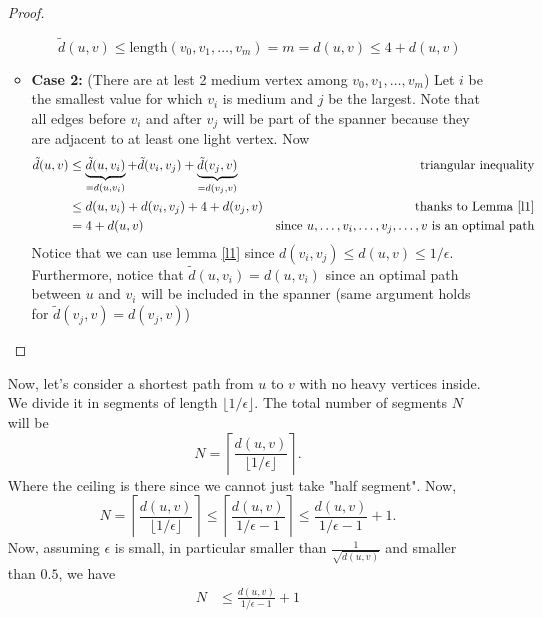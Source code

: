 \documentclass[11pt]{article}
\begin{document}
\begin{enumerate}
\begin{proof}
\begin{itemize}
            \begin{equation*}
                \tilde d(u,v) \leq \text{length}(v_0,v_1,\dots,v_m) = m = d(u,v) \leq 4 + d(u,v)
            \end{equation*}
            \item \textbf{Case 2:} (There are at lest 2 medium vertex among $v_0,v_1,\dots,v_m$) 
            Let $i$ be the smallest value for which $v_i$ is medium and $j$ be the largest. Note that all edges before $v_i$ and after $v_j$ will be part of the spanner because they are adjacent to at least one light vertex. Now
            \begin{align*}
                \tilde d(u,v) &\leq  \underbrace{\tilde d(u,v_i)}_{= d(u,v_i)} + \tilde d(v_i,v_j) + \underbrace{\tilde d(v_j,v)}_{= d(v_j,v)} & \text{triangular inequality}\\
                &\leq d(u,v_i) + d(v_i,v_j) + 4 + d(v_j,v) & \text{thanks to Lemma \ref{l1}}\\
                &= 4 + d(u,v) & \text{since $u,\dots, v_i, \dots, v_j, \dots, v$ is an optimal path}
            \end{align*}
            Notice that we can use lemma \ref{l1} since $d(v_i,v_j) \leq d(u,v)\leq 1/\epsilon$. Furthermore, notice that $\tilde d(u,v_i) = d(u,v_i)$ since an optimal path between $u$ and $v_i$ will be included in the spanner (same argument holds for $\tilde d(v_j,v) = d(v_j,v)$)
        \end{itemize}
    \end{proof}
    Now, let's consider a shortest path from $u$ to $v$ with no heavy vertices inside. We divide it in segments of length $\lfloor 1/\epsilon \rfloor$. The total number of segments $N$ will be 
    \begin{equation*}
        N = \left\lceil\frac{d(u,v)}{\lfloor 1/\epsilon \rfloor}\right\rceil.
    \end{equation*}
    Where the ceiling is there since we cannot just take "half segment". Now,
    \begin{equation*}
        N =\left\lceil\frac{d(u,v)}{\lfloor 1/\epsilon \rfloor}\right\rceil \leq \left\lceil\frac{d(u,v)}{1/\epsilon - 1}\right\rceil \leq \frac{d(u,v)}{1/\epsilon - 1} + 1.
    \end{equation*}
    Now, assuming $\epsilon$ is small, in particular smaller than $\frac{1}{\sqrt{d(u,v)}}$ and smaller than $0.5$, we have
    \begin{align*}
        N &\leq \frac{d(u,v)}{1/\epsilon - 1} + 1\\

\end{align*}
\end{enumerate}
\end{document}
